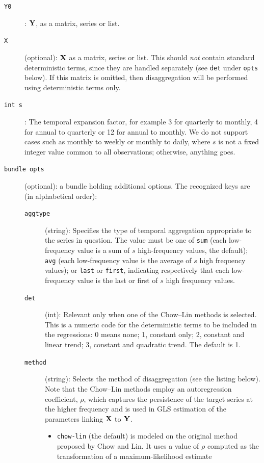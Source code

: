 \begin{description}
\item[\texttt{Y0}]: $\mathbf{Y}$, as a matrix, series or list.
\item[\texttt{X}](optional): $\mathbf{X}$ as a matrix, series or list.  This
  should \textit{not} contain standard deterministic terms, since they
  are handled separately (see \texttt{det} under \texttt{opts}
  below). If this matrix is omitted, then disaggregation will be
  performed using deterministic terms only.
\item[\texttt{int s}]: The temporal expansion factor, for example 3
  for quarterly to monthly, 4 for annual to quarterly or 12 for annual
  to monthly.  We do not support cases such as monthly to weekly or
  monthly to daily, where $s$ is not a fixed integer value common to
  all observations; otherwise, anything goes.
\item[\texttt{bundle opts}](optional): a bundle holding additional
  options. The recognized keys are (in alphabetical order):
  \begin{description}
  \item[\texttt{aggtype}](string): Specifies the type of temporal
    aggregation appropriate to the series in question. The value must
    be one of \texttt{sum} (each low-frequency value is a sum of $s$
    high-frequency values, the default); \texttt{avg} (each
    low-frequency value is the average of $s$ high frequency values);
    or \texttt{last} or \texttt{first}, indicating respectively that
    each low-frequency value is the last or first of $s$ high
    frequency values.
  \item[\texttt{det}](int): Relevant only when one of the Chow--Lin
    methods is selected. This is a numeric code for the deterministic
    terms to be included in the regressions: 0 means none; 1, constant
    only; 2, constant and linear trend; 3, constant and quadratic
    trend. The default is 1.
  \item[\texttt{method}](string): Selects the method of disaggregation
    (see the listing below). Note that the Chow--Lin methods employ an
    autoregression coefficient, $\rho$, which captures the persistence
    of the target series at the higher frequency and is used in GLS
    estimation of the parameters linking $\mathbf{X}$ to $\mathbf{Y}$.
    \begin{itemize}
    \item \texttt{chow-lin} (the default) is modeled on the original
      method proposed by Chow and Lin. It uses a value of $\rho$
      computed as the transformation of a maximum-likelihood estimate

\end{itemize}
\end{description}
\end{description}
